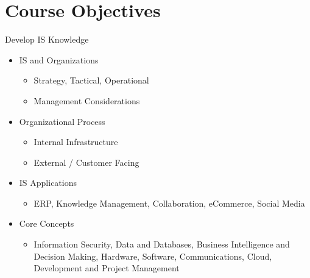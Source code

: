 

\section{Course Objectives}

\begin{frame}{ Develop IS Knowledge}
    \begin{itemize}
        \item[{\color{pantherpurple} \faIcon{people-carry}}] IS and Organizations
        \begin{itemize}
            \item Strategy, Tactical, Operational
            \item Management Considerations
        \end{itemize}
        \item[{\color{pantherpurple} \faIcon{sitemap}}] Organizational Process
        \begin{itemize}
            \item Internal Infrastructure
            \item External / Customer Facing
        \end{itemize}
        \item[{\color{pantherpurple} \faIcon{code-branch}}] IS Applications
        \begin{itemize}
            \item ERP, Knowledge Management, Collaboration, eCommerce, Social Media
        \end{itemize}
        \item[{\color{pantherpurple} \faIcon{meteor}}] Core Concepts
        \begin{itemize}
            \item Information Security, Data and Databases, Business Intelligence and Decision Making, Hardware, Software, Communications, Cloud, Development and Project Management
        \end{itemize}
    \end{itemize}
\end{frame}

